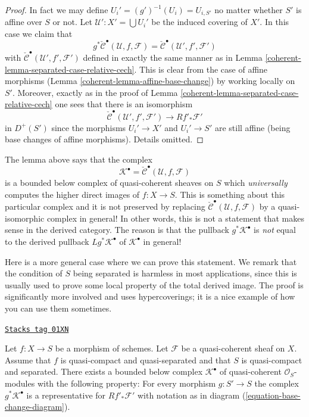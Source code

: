 \begin{proof}

In fact we may define $U_i' = (g')^{-1}(U_i) = U_{i, S'}$ no matter
whether $S'$ is affine over $S$ or not.
Let $\mathcal{U}' : X' = \bigcup U_i'$ be the induced covering of $X'$.
In this case we claim that
$$
g^*\check{\mathcal{C}}^\bullet(\mathcal{U}, f, \mathcal{F})
=
\check{\mathcal{C}}^\bullet(\mathcal{U}', f', \mathcal{F}')
$$
with $\check{\mathcal{C}}^\bullet(\mathcal{U}', f', \mathcal{F}')$
defined in exactly the same manner as in
Lemma \ref{coherent-lemma-separated-case-relative-cech}.
This is clear from the case of affine morphisms
(Lemma \ref{coherent-lemma-affine-base-change}) by working locally on $S'$.
Moreover, exactly as in the proof of
Lemma \ref{coherent-lemma-separated-case-relative-cech}
one sees that there is an isomorphism
$$
\check{\mathcal{C}}^\bullet(\mathcal{U}', f', \mathcal{F}')
\longrightarrow
Rf'_*\mathcal{F}'
$$
in $D^{+}(S')$ since the morphisms $U_i' \to X'$ and $U_i' \to S'$
are still affine (being base changes of affine morphisms).
Details omitted.
\end{proof}

The lemma above says that the complex
$$
\mathcal{K}^\bullet = \check{\mathcal{C}}^\bullet(\mathcal{U}, f, \mathcal{F})
$$
is a bounded below complex of quasi-coherent sheaves on $S$ which
{\it universally} computes the higher direct images of $f : X \to S$.
This is something about this particular complex and
it is not preserved by replacing
$\check{\mathcal{C}}^\bullet(\mathcal{U}, f, \mathcal{F})$ by
a quasi-isomorphic complex in general! In other words, this is
not a statement that makes sense in the derived category.
The reason is that the pullback $g^*\mathcal{K}^\bullet$ is
{\it not} equal to the derived pullback $Lg^*\mathcal{K}^\bullet$
of $\mathcal{K}^\bullet$ in general!

\medskip\noindent
Here is a more general case where we can prove this statement.
We remark that the condition of $S$ being separated is harmless
in most applications, since this is usually used to prove some
local property of the total derived image.
The proof is significantly more involved and uses hypercoverings;
it is a nice example of how you can use them sometimes.

\begin{lemma}[Hypercoverings]
\label{coherent-lemma-hypercoverings}
\href{https://stacks.math.columbia.edu/tag/01XN}{\texttt{Stacks tag 01XN}}

Let $f : X \to S$ be a morphism of schemes.
Let $\mathcal{F}$ be a quasi-coherent sheaf on $X$.
Assume that $f$ is quasi-compact and quasi-separated and
that $S$ is quasi-compact and separated.
There exists a bounded below complex $\mathcal{K}^\bullet$
of quasi-coherent $\mathcal{O}_S$-modules with the
following property: For every morphism
$g : S' \to S$ the complex $g^*\mathcal{K}^\bullet$ is
a representative for $Rf'_*\mathcal{F}'$ with notation as in
diagram (\ref{equation-base-change-diagram}).
\end{lemma}

